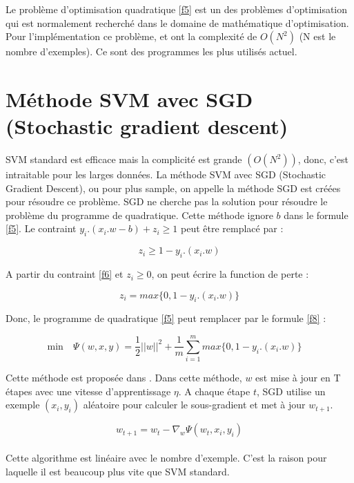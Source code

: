 Le problème d'optimisation quadratique \ref{f5} est un des problèmes d'optimisation qui est normalement recherché dans le domaine de mathématique d'optimisation. Pour l'implémentation ce problème, \cite{jp98} et \cite{cl01} ont la complexité de $O(N^2)$ (N est le nombre d'exemples). Ce sont des programmes les plus utilisés actuel.

\section{Méthode SVM avec SGD (Stochastic gradient descent)}
SVM standard est efficace mais la complicité est grande $(O(N^2))$, donc, c'est intraitable pour les larges données. La méthode SVM avec SGD (Stochastic Gradient Descent), ou pour plus sample, on appelle la méthode SGD est créées pour résoudre ce problème. SGD ne cherche pas la solution pour résoudre le problème du programme de quadratique. Cette méthode ignore $b$  dans le formule \ref{f5}. Le contraint $y_i.(x_i.w - b) + z_i \geq 1$ peut être remplacé par : 

\begin{equation}
z_i \geq 1 - y_i.(x_i.w)
\label{f6}
\end{equation}

A partir du contraint \ref{f6} et $z_i \geq 0$, on peut écrire la function de perte :

\begin{equation}
z_i = max\lbrace0, 1 - y_i.(x_i.w)\rbrace
\label{f7}
\end{equation}

Donc, le programme de quadratique \ref{f5} peut remplacer par le formule \ref{f8} :

\begin{equation}
\mbox{min}\quad \Psi(w, x, y) = \frac{1}{2} ||w||^2 + \frac{1}{m}\sum\limits_{i=1}^m max\lbrace0, 1 - y_i.(x_i.w)\rbrace\quad
\label{f7}
\end{equation}

Cette méthode est proposée dans \cite{sss07}. Dans cette méthode, $w$ est mise à jour en T étapes avec une vitesse d'apprentissage $\eta$. A chaque étape $t$, SGD utilise un exemple $(x_i, y_i)$ aléatoire pour calculer le sous-gradient et met à jour $w_{t+1}$. 

\begin{equation}
w_{t+1} = w_t - \nabla_w{\Psi(w_t, x_i, y_i)}
\label{f8}
\end{equation}
\\

Cette algorithme est linéaire avec le nombre d'exemple. C'est la raison pour laquelle il est beaucoup plus vite que SVM standard. 

